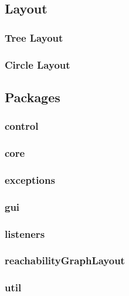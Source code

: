 \documentclass[10pt, a4paper]{article}
\begin{document}
\subsection{Layout}
\label{label:layout}

\subsubsection{Tree Layout}
\label{label:treeLayout}


\subsubsection{Circle Layout}
\label{label:circleLayout}

\subsection{Packages}

\subsubsection{control}

\subsubsection{core}
\subsubsection{exceptions}
\subsubsection{gui}
\subsubsection{listeners}
\subsubsection{reachabilityGraphLayout}
\subsubsection{util}


\newpage









 
%

%
\end{document}
